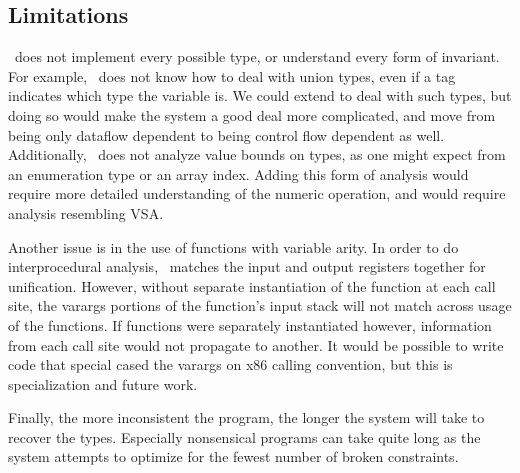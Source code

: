 \subsection{Limitations}
\bitr\ does not implement every possible type, or understand every form of invariant. For example, \bitr\ does not know how to deal with union types, even if a tag indicates which type the variable is. We could extend to deal with such types, but doing so would make the system a good deal more complicated, and move from being only dataflow dependent to being control flow dependent as well. Additionally, \bitr\ does not analyze value bounds on types, as one might expect from an enumeration type or an array index. Adding this form of analysis would require more detailed understanding of the numeric operation, and would require analysis resembling VSA\cite{vsa}.

Another issue is in the use of functions with variable arity. In order to do interprocedural analysis, \bitr\ matches the input and output registers together for unification. However, without separate instantiation of the function at each call site, the varargs portions of the function's input stack will not match across usage of the functions. If functions were separately instantiated however, information from each call site would not propagate to another. It would be possible to write code that special cased the varargs on x86 calling convention, but this is specialization and future work.

Finally, the more inconsistent the program, the longer the system will take to recover the types. Especially nonsensical programs can take quite long as the system attempts to optimize for the fewest number of broken constraints.
